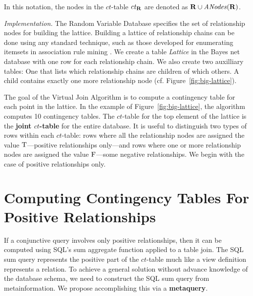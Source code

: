 \documentclass{vldb}
\newcommand{\ct}{\mathit{ct}}
\begin{document}
In this notation, the nodes in the $\ct$-table  $\ct_{\set{\Relation}}$  are denoted as $\mathbf{R} \cup \it{ANodes}({\mathbf{R}})$. 

\emph{Implementation.} The Random Variable Database specifies the set of relationship nodes for building the lattice. Building a lattice of relationship chains can be done using any standard technique, such as those developed for enumerating itemsets in association rule  mining \cite{Agrawal1994}. 
We create a table {\em Lattice} in the Bayes net database with one row for each relationship chain. We also create two auxilliary tables: One that lists which relationship chains are children of which others. A child contains exactly one more relationship node (cf. Figure~\ref{fig:big-lattice}). 

The goal of the Virtual Join Algorithm is to compute a contingency table for each point in the lattice. 
In the example of Figure~\ref{fig:big-lattice}, the algorithm computes 10 contingency tables. The $\ct$-table for the top element of the lattice is the \textbf{joint $\ct$-table} for the entire database. 
It is useful to distinguish two types of rows within each $\ct$-table: rows where all the relationship nodes are assigned the value $\mathrm{T}$---positive relationships only---and rows where one or more relationship nodes are assigned the value $\mathrm{F}$---some negative relationships. 
We begin with the case of positive relationships only.


\section{Computing Contingency Tables For Positive Relationships} 


If a conjunctive query involves only positive relationships, then it can be computed using SQL's sum aggregate function applied to a table join. The SQL sum query represents the positive part of the $\ct$-table much like a view definition represents a relation. 
To achieve a general solution without advance knowledge of the database schema, we need to construct the SQL sum query from metainformation. 
We propose accomplishing this via a \textbf{metaquery}.
\end{document}

